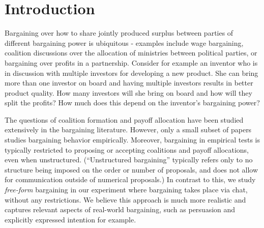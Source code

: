 \bgroup
\let\footnoterule\relax

\begin{singlespace}
\maketitle



\end{singlespace}
\thispagestyle{empty}

\clearpage

\setcounter{page}{1}




\newpage
\section{Introduction} \label{sec:intro}


Bargaining over how to share jointly produced surplus between parties of different bargaining power is ubiquitous - examples include wage bargaining, coalition discussions over the allocation of ministries between political parties, or bargaining over profits in a partnership. 
Consider for example an inventor who is in discussion with multiple investors for developing a new product. She can bring more than one investor on board and having multiple investors results in better product quality. How many investors will she bring on board and how will they split the profits? How much does this depend on the inventor's bargaining power?

The questions of coalition formation and payoff allocation have been studied extensively in the bargaining literature. However, only a small subset of papers studies bargaining behavior empirically. Moreover, bargaining in empirical tests is typically restricted to proposing or accepting coalitions and payoff allocations, even when unstructured. (``Unstructured bargaining'' typically refers only to no structure being imposed on the order or number of proposals, and does not allow for communication outside of numerical proposals.) In contrast to this, we study \emph{free-form} bargaining in our experiment where bargaining takes place via chat, without any restrictions. We believe this approach is much more realistic and captures relevant aspects of real-world bargaining, such as persuasion and explicitly expressed intention for example.

